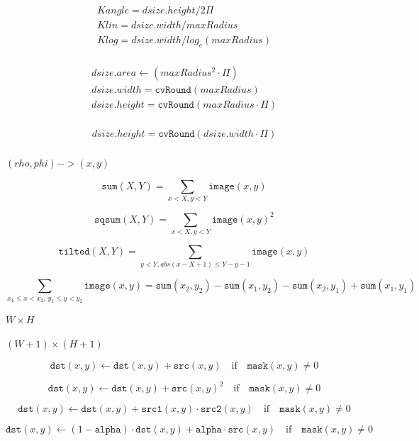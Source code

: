 \documentclass{article}
\begin{document}
\[\begin{array}{l}
Kangle = dsize.height / 2\Pi \\
Klin = dsize.width / maxRadius \\
Klog = dsize.width / log_e(maxRadius) \\
\end{array}
\]
\pagebreak

\[\begin{array}{l}
dsize.area  \leftarrow (maxRadius^2 \cdot \Pi) \\
dsize.width = \texttt{cvRound}(maxRadius) \\
dsize.height = \texttt{cvRound}(maxRadius \cdot \Pi) \\
\end{array}\]
\pagebreak

\[\begin{array}{l}
dsize.height = \texttt{cvRound}(dsize.width \cdot \Pi) \\
\end{array}
\]
\pagebreak

$(rho, phi)->(x, y)$
\pagebreak

\[\texttt{sum} (X,Y) =  \sum _{x<X,y<Y}  \texttt{image} (x,y)\]
\pagebreak

\[\texttt{sqsum} (X,Y) =  \sum _{x<X,y<Y}  \texttt{image} (x,y)^2\]
\pagebreak

\[\texttt{tilted} (X,Y) =  \sum _{y<Y,abs(x-X+1) \leq Y-y-1}  \texttt{image} (x,y)\]
\pagebreak

\[\sum _{x_1 \leq x < x_2,  \, y_1  \leq y < y_2}  \texttt{image} (x,y) =  \texttt{sum} (x_2,y_2)- \texttt{sum} (x_1,y_2)- \texttt{sum} (x_2,y_1)+ \texttt{sum} (x_1,y_1)\]
\pagebreak

$W \times H$
\pagebreak

$(W+1)\times (H+1)$
\pagebreak

\[\texttt{dst} (x,y)  \leftarrow \texttt{dst} (x,y) +  \texttt{src} (x,y)  \quad \text{if} \quad \texttt{mask} (x,y)  \ne 0\]
\pagebreak

\[\texttt{dst} (x,y)  \leftarrow \texttt{dst} (x,y) +  \texttt{src} (x,y)^2  \quad \text{if} \quad \texttt{mask} (x,y)  \ne 0\]
\pagebreak

\[\texttt{dst} (x,y)  \leftarrow \texttt{dst} (x,y) +  \texttt{src1} (x,y)  \cdot \texttt{src2} (x,y)  \quad \text{if} \quad \texttt{mask} (x,y)  \ne 0\]
\pagebreak

\[\texttt{dst} (x,y)  \leftarrow (1- \texttt{alpha} )  \cdot \texttt{dst} (x,y) +  \texttt{alpha} \cdot \texttt{src} (x,y)  \quad \text{if} \quad \texttt{mask} (x,y)  \ne 0\]
\pagebreak
\end{document}
